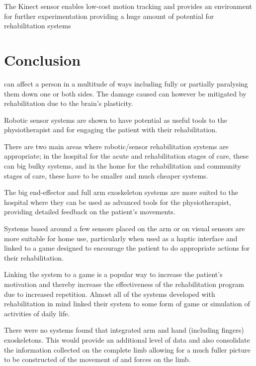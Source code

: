 \documentclass[journal]{IEEEtran}
\begin{document}
The Kinect sensor enables low-cost motion tracking and provides an environment 
for further experimentation providing a huge amount of potential for 
rehabilitation systems

\section{Conclusion}
 can affect a person in a multitude of ways including fully or 
partially paralysing them down one or both sides. The damage caused can however be 
mitigated by rehabilitation due to the brain's plasticity.

Robotic sensor systems are shown to have potential as useful tools to the 
physiotherapist and for engaging the patient with their rehabilitation.

There are two main areas where robotic/sensor rehabilitation systems are appropriate; 
in the hospital for the acute and rehabilitation stages of care, these can big bulky 
systems, and in the home for the rehabilitation and community stages of care, these 
have to be smaller and much cheaper systems.

The big end-effector and full arm exoskeleton systems are more suited to the hospital 
where they can be used as advanced tools for the physiotherapist, providing detailed 
feedback on the patient's movements.

Systems based around a few sensors placed on the arm or on visual sensors are more 
suitable for home use, particularly when used as a haptic interface and linked to 
a game designed to encourage the patient to do appropriate actions for their 
rehabilitation. 

Linking the system to a game is a popular way to increase the patient's motivation and 
thereby increase the effectiveness of the rehabilitation program due to increased 
repetition. Almost all of the systems developed with rehabilitation in mind linked 
their system to some form of game or simulation of activities of daily life.

There were no systems found that integrated arm and hand (including fingers) exoskeletons. 
This would provide an additional level of data and also consolidate the information collected 
on the complete limb allowing for a much fuller picture to be constructed of the movement of 
and forces on the limb.


\end{document}
